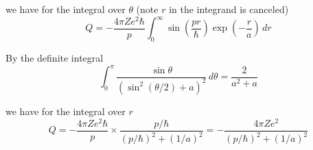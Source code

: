we have for the integral over $\theta$ (note $r$ in the integrand is canceled)
\begin{equation*}
Q=-\frac{4\pi Ze^2\hbar}{p}
\int_0^\infty\sin\left(\frac{pr}{\hbar}\right)
\exp\left(-\frac{r}{a}\right)
\,dr
\end{equation*}

By the definite integral
\begin{equation*}
\int_0^\pi\frac{\sin\theta}{\left(\sin^2(\theta/2)+a\right)^2}\,d\theta=\frac{2}{a^2+a}
\end{equation*}

we have for the integral over $r$
\begin{equation*}
Q=-\frac{4\pi Ze^2\hbar}{p}\times
\frac{p/\hbar}
{(p/\hbar)^2+(1/a)^2}
=-\frac{4\pi Ze^2}{(p/\hbar)^2+(1/a)^2}
\end{equation*}


